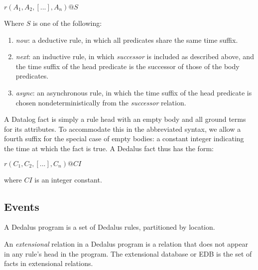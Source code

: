 \documentclass{acm_proc_article-sp-sigmod09}
\newcommand{\wrm}[1]{{\color{BurntOrange}{#1 -- wrm}}}
\begin{document}
$r(A_{1},A_{2},[...],A_{n})@S$

Where $S$ is one of the following:
\begin{enumerate}
\item \emph{now}: a deductive rule, in which all predicates share the same time suffix.
\item \emph{next}: an inductive rule, in which \emph{successor} is included as described above, and the time suffix of the head predicate
is the successor of those of the body predicates. 
\item \emph{async}: an asynchronous rule, in which the time suffix of the head predicate is chosen nondeterministically from the \emph{successor} 
relation.
\end{enumerate}


A Datalog fact is simply a rule head with an empty body and all ground terms for its attributes.  To accommodate this in the abbreviated syntax,
we allow a fourth suffix for the special case of empty bodies: a constant integer indicating the time at which the fact is true.  A Dedalus fact thus has the form:

$r(C_1, C_2, [...], C_n)@CI$

where $CI$ is an integer constant.



\subsection{Events}

\wrm{bunch of random definitions}

 \begin{definition}
%
A Dedalus program is a set of Dedalus rules, partitioned by location.
%
\end{definition}

 \begin{definition} 
%
An \emph{extensional} relation in a Dedalus program is a relation that does not
appear in any rule's head in the program.  The extensional database or EDB is
the set of facts in extensional relations.
%
\end{definition}
\end{document}
